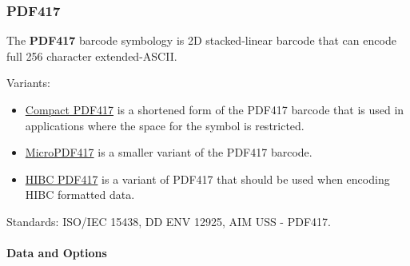 \hypertarget{pdf417}{%
\subsubsection{PDF417}\label{pdf417}}

The \textbf{PDF417} barcode symbology is 2D stacked-linear barcode that
can encode full 256 character extended-ASCII.

Variants:

\begin{itemize}
\tightlist
\item
  \protect\hyperlink{compact-pdf417}{Compact PDF417} is a shortened form
  of the PDF417 barcode that is used in applications where the space for
  the symbol is restricted.
\item
  \protect\hyperlink{micropdf417}{MicroPDF417} is a smaller variant of
  the PDF417 barcode.
\item
  \protect\hyperlink{hibc-symbols}{HIBC PDF417} is a variant of PDF417
  that should be used when encoding HIBC formatted data.
\end{itemize}

Standards: ISO/IEC 15438, DD ENV 12925, AIM USS - PDF417.

\hypertarget{data-and-options-14}{%
\paragraph{Data and Options}\label{data-and-options-14}}


